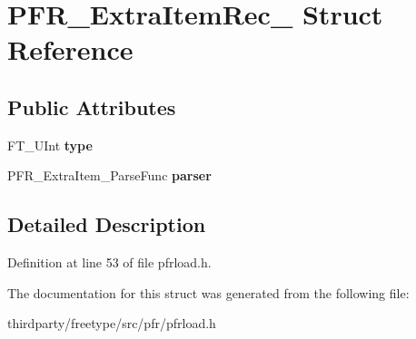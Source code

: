 \hypertarget{struct_p_f_r___extra_item_rec__}{}\section{P\+F\+R\+\_\+\+Extra\+Item\+Rec\+\_\+ Struct Reference}
\label{struct_p_f_r___extra_item_rec__}
\subsection*{Public Attributes}
\begin{DoxyCompactItemize}
\item 
\mbox{\label{struct_p_f_r___extra_item_rec___ab29a98311f1f7c16c73083212301f470}} 
F\+T\+\_\+\+U\+Int {\bfseries type}
\item 
\mbox{\label{struct_p_f_r___extra_item_rec___ac9e55eddd23a1ab1ec63fd6e2b3c950b}} 
P\+F\+R\+\_\+\+Extra\+Item\+\_\+\+Parse\+Func {\bfseries parser}
\end{DoxyCompactItemize}


\subsection{Detailed Description}


Definition at line 53 of file pfrload.\+h.



The documentation for this struct was generated from the following file\+:\begin{DoxyCompactItemize}
\item 
thirdparty/freetype/src/pfr/pfrload.\+h\end{DoxyCompactItemize}
